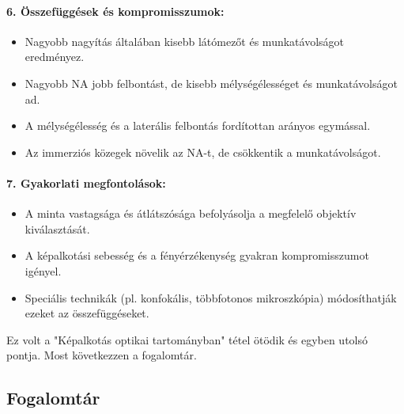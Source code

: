 \documentclass[a4paper,12pt]{article}
\begin{document}
\paragraph{6. Összefüggések és kompromisszumok:} \begin{itemize} \item Nagyobb nagyítás általában kisebb látómezőt és munkatávolságot eredményez. \item Nagyobb NA jobb felbontást, de kisebb mélységélességet és munkatávolságot ad. \item A mélységélesség és a laterális felbontás fordítottan arányos egymással. \item Az immerziós közegek növelik az NA-t, de csökkentik a munkatávolságot. \end{itemize}

\paragraph{7. Gyakorlati megfontolások:} \begin{itemize} \item A minta vastagsága és átlátszósága befolyásolja a megfelelő objektív kiválasztását. \item A képalkotási sebesség és a fényérzékenység gyakran kompromisszumot igényel. \item Speciális technikák (pl. konfokális, többfotonos mikroszkópia) módosíthatják ezeket az összefüggéseket. \end{itemize}

Ez volt a "Képalkotás optikai tartományban" tétel ötödik és egyben utolsó pontja. Most következzen a fogalomtár.

\subsection{Fogalomtár}
\end{document}
